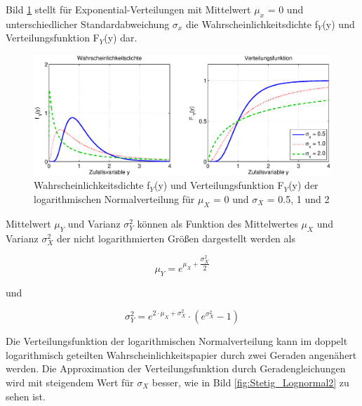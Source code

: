 \noindent Bild \ref{fig:Stetig_Lognormal1} stellt f\"{u}r Exponential-Verteilungen mit Mittelwert $\mu_{x}$ = 0 und unterschiedlicher Standardabweichung $\sigma_{x}$ die Wahrscheinlichkeitsdichte f$_{Y}$(y) und Verteilungsfunktion F$_{Y}$(y) dar.

\begin{figure}[H]
  \centerline{\includegraphics[width=1\textwidth]{Kapitel4/Bilder/image37}}
  \caption{Wahrscheinlichkeitsdichte f${}_{Y}$(y) und Verteilungsfunktion F${}_{Y}$(y) der logarithmischen Normalverteilung f\"{u}r $\mu_{X}$ = 0 und $\sigma_{X}$ = 0.5, 1 und 2}
  \label{fig:Stetig_Lognormal1}
\end{figure}

\noindent Mittelwert $\mu_{Y}$ und Varianz $\sigma_{Y}^{2}$ k\"{o}nnen als Funktion des Mittelwertes $\mu_{X}$ und Varianz $\sigma_{X}^{2}$ der nicht logarithmierten Gr\"{o}{\ss}en dargestellt werden als 

\begin{equation}\label{eq:fourtwohundredtwentythree}
\mu _{Y} =e^{\mu _{X} +\dfrac{\sigma _{X}^{2} }{2}}
\end{equation}

\noindent und

\begin{equation}\label{eq:fourtwohundredtwentyfour}
\sigma _{Y}^{2} =e^{2\cdot \mu _{X} +\sigma _{X}^{2} } \cdot \left(e^{\sigma _{X}^{2} } -1\right)
\end{equation}

\noindent Die Verteilungsfunktion der logarithmischen Normalverteilung kann im doppelt logarithmisch geteilten Wahrscheinlichkeitspapier durch zwei Geraden angen\"{a}hert werden. Die Approximation der Verteilungsfunktion durch Geradengleichungen wird mit steigendem Wert f\"{u}r $\sigma_{X}$ besser, wie in Bild \ref{fig:Stetig_Lognormal2} zu sehen ist.

